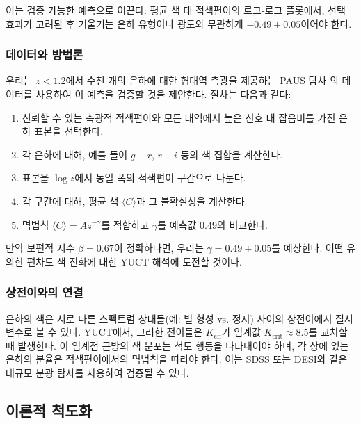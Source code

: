 \documentclass[11pt,a4paper]{article}
\begin{document}
	이는 검증 가능한 예측으로 이끈다: 평균 색 대 적색편이의 로그-로그 플롯에서, 선택 효과가 고려된 후 기울기는 은하 유형이나 광도와 무관하게 \(-0.49 \pm 0.05\)이어야 한다.
	
	\subsubsection{데이터와 방법론}
	
	우리는 \(z < 1.2\)에서 수천 개의 은하에 대한 협대역 측광을 제공하는 PAUS 탐사 \cite{Alarcon2019}의 데이터를 사용하여 이 예측을 검증할 것을 제안한다. 절차는 다음과 같다:
	\begin{enumerate}
		\item 신뢰할 수 있는 측광적 적색편이와 모든 대역에서 높은 신호 대 잡음비를 가진 은하 표본을 선택한다.
		\item 각 은하에 대해, 예를 들어 \(g-r\), \(r-i\) 등의 색 집합을 계산한다.
		\item 표본을 \(\log z\)에서 동일 폭의 적색편이 구간으로 나눈다.
		\item 각 구간에 대해, 평균 색 \(\langle C \rangle\)과 그 불확실성을 계산한다.
		\item 멱법칙 \(\langle C \rangle = A z^{-\gamma}\)를 적합하고 \(\gamma\)를 예측값 \(0.49\)와 비교한다.
	\end{enumerate}
	
	만약 보편적 지수 \(\beta = 0.67\)이 정확하다면, 우리는 \(\gamma = 0.49 \pm 0.05\)를 예상한다. 어떤 유의한 편차도 색 진화에 대한 YUCT 해석에 도전할 것이다.
	
	\subsubsection{상전이와의 연결}
	
	은하의 색은 서로 다른 스펙트럼 상태들(예: 별 형성 vs. 정지) 사이의 상전이에서 질서 변수로 볼 수 있다. YUCT에서, 그러한 전이들은 \(K_{\mathrm{eff}}\)가 임계값 \(K_{\mathrm{crit}} \approx 8.5\)를 교차할 때 발생한다. 이 임계점 근방의 색 분포는 척도 행동을 나타내어야 하며, 각 상에 있는 은하의 분율은 적색편이에서의 멱법칙을 따라야 한다. 이는 SDSS 또는 DESI와 같은 대규모 분광 탐사를 사용하여 검증될 수 있다.
	
	\subsection{이론적 척도화}
	
\end{document}
